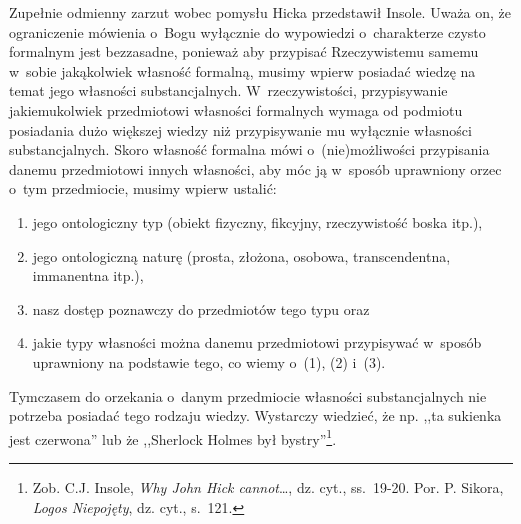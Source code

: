 Zupełnie odmienny zarzut wobec pomysłu Hicka przedstawił Insole. Uważa on, że ograniczenie mówienia o~Bogu wyłącznie do wypowiedzi o~charakterze czysto formalnym jest bezzasadne, ponieważ aby przypisać Rzeczywistemu samemu w~sobie jakąkolwiek własność formalną, musimy wpierw posiadać wiedzę na temat jego własności substancjalnych. W~rzeczywistości, przypisywanie jakiemukolwiek przedmiotowi własności formalnych wymaga od podmiotu posiadania dużo większej wiedzy niż przypisywanie mu wyłącznie własności substancjalnych. Skoro własność formalna mówi o~(nie)możliwości przypisania danemu przedmiotowi innych własności, aby móc ją w~sposób uprawniony orzec o~tym przedmiocie, musimy wpierw ustalić:

\begin{enumerate}[label = (\arabic*)]
\item jego ontologiczny typ (obiekt fizyczny, fikcyjny, rzeczywistość boska itp.),
\item jego ontologiczną naturę (prosta, złożona, osobowa, transcendentna, immanentna itp.),
\item nasz dostęp poznawczy do przedmiotów tego typu oraz
\item jakie typy własności można danemu przedmiotowi przypisywać w~sposób uprawniony na podstawie tego, co wiemy o~(1), (2) i~(3).
\end{enumerate}
Tymczasem do orzekania o~danym przedmiocie własności substancjalnych nie potrzeba posiadać tego rodzaju wiedzy. Wystarczy wiedzieć, że np. ,,ta sukienka jest czerwona'' lub że ,,Sherlock Holmes był bystry''\footnote{Zob. C.J. Insole, \textit{Why John Hick cannot}\ldots, dz. cyt., ss.~19-20. Por. P. Sikora, \textit{Logos Niepojęty}, dz. cyt., s.~121.}.

